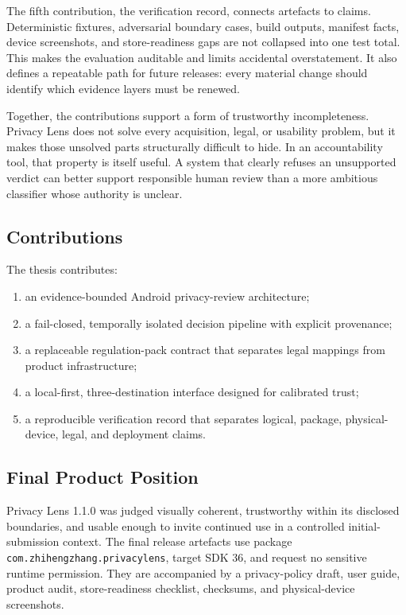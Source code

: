 The fifth contribution, the verification record, connects artefacts to claims. Deterministic fixtures, adversarial boundary cases, build outputs, manifest facts, device screenshots, and store-readiness gaps are not collapsed into one test total. This makes the evaluation auditable and limits accidental overstatement. It also defines a repeatable path for future releases: every material change should identify which evidence layers must be renewed.

Together, the contributions support a form of trustworthy incompleteness. Privacy Lens does not solve every acquisition, legal, or usability problem, but it makes those unsolved parts structurally difficult to hide. In an accountability tool, that property is itself useful. A system that clearly refuses an unsupported verdict can better support responsible human review than a more ambitious classifier whose authority is unclear.

\subsection{Contributions}

The thesis contributes:

\begin{enumerate}
    \item an evidence-bounded Android privacy-review architecture;
    \item a fail-closed, temporally isolated decision pipeline with explicit provenance;
    \item a replaceable regulation-pack contract that separates legal mappings from product infrastructure;
    \item a local-first, three-destination interface designed for calibrated trust;
    \item a reproducible verification record that separates logical, package, physical-device, legal, and deployment claims.
\end{enumerate}

\subsection{Final Product Position}

Privacy Lens 1.1.0 was judged visually coherent, trustworthy within its disclosed boundaries, and usable enough to invite continued use in a controlled initial-submission context. The final release artefacts use package \texttt{com.zhihengzhang.privacylens}, target SDK 36, and request no sensitive runtime permission. They are accompanied by a privacy-policy draft, user guide, product audit, store-readiness checklist, checksums, and physical-device screenshots.

